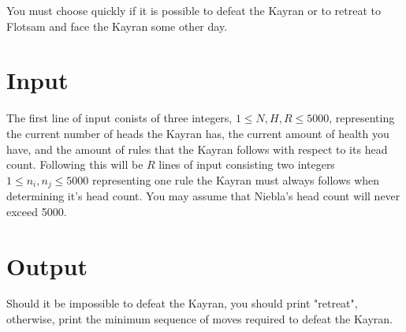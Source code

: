 \noindent You must choose quickly if it is possible to defeat the Kayran or to retreat to Flotsam and face the Kayran
some other day.\\

\section*{Input}

The first line of input conists of three integers, $1 \leq N, H, R \leq 5000$, representing the current number of heads the
Kayran has, the current amount of health you have, and the amount of rules that the Kayran follows with respect to its
head count. Following this will be $R$ lines of input consisting two integers $1 \leq n_i , n_j \leq 5000$ representing one
rule the Kayran must always follows when determining it's head count. You may assume that Niebla's head count will never
exceed 5000. \\

\section*{Output}
Should it be impossible to defeat the Kayran, you should print "retreat", otherwise, print the minimum sequence of
moves required to defeat the Kayran. \\
